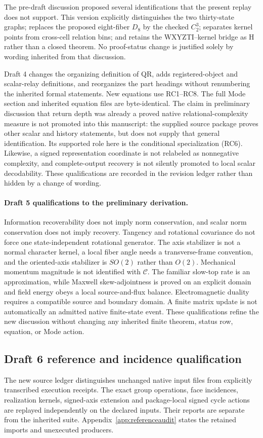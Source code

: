 The pre-draft discussion proposed several identifications that the present replay does not support. This version explicitly distinguishes the two thirty-state graphs; replaces the proposed eight-fiber $D_8$ by the checked $C_2^3$; separates kernel points from cross-cell relation bins; and retains the WXYZTI--kernel bridge as H rather than a closed theorem. No proof-status change is justified solely by wording inherited from that discussion.


Draft 4 changes the organizing definition of QR, adds registered-object and scalar-relay definitions, and reorganizes the part headings without renumbering the inherited formal statements. New equations use RC1--RC8. The full Mode section and inherited equation files are byte-identical. The claim in preliminary discussion that return depth was already a proved native relational-complexity measure is not promoted into this manuscript: the supplied source package proves other scalar and history statements, but does not supply that general identification. Its supported role here is the conditional specialization (RC6). Likewise, a signed representation coordinate is not relabeled as nonnegative complexity, and complete-output recovery is not silently promoted to local scalar decodability. These qualifications are recorded in the revision ledger rather than hidden by a change of wording.


\paragraph{Draft 5 qualifications to the preliminary derivation.}
Information recoverability does not imply norm conservation, and scalar norm conservation does not imply recovery. Tangency and rotational covariance do not force one state-independent rotational generator. The axis stabilizer is not a normal character kernel, a local fiber angle needs a transverse-frame convention, and the oriented-axis stabilizer is $SO(2)$ rather than $O(2)$. Mechanical momentum magnitude is not identified with $\mathcal C$. The familiar slow-top rate is an approximation, while Maxwell skew-adjointness is proved on an explicit domain and field energy obeys a local source-and-flux balance. Electromagnetic duality requires a compatible source and boundary domain. A finite matrix update is not automatically an admitted native finite-state event. These qualifications refine the new discussion without changing any inherited finite theorem, status row, equation, or Mode action.

\subsection{Draft 6 reference and incidence qualification}
The new source ledger distinguishes unchanged native input files from explicitly transcribed execution receipts. The exact group operations, face incidences, realization kernels, signed-axis extension and package-local signed cycle actions are replayed independently on the declared inputs. Their reports are separate from the inherited suite. Appendix~\ref{app:referenceaudit} states the retained imports and unexecuted producers.

